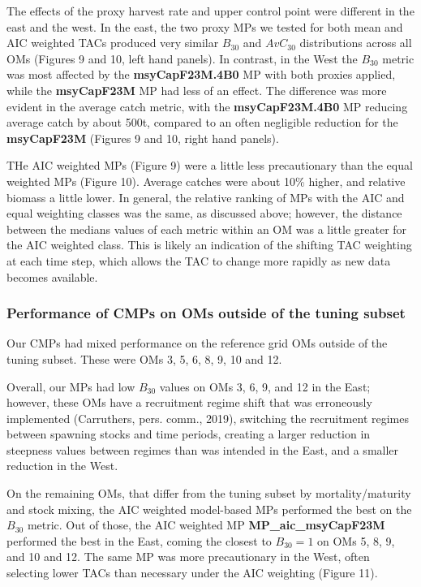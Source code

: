 \documentclass[]{article}
\begin{document}
The effects of the proxy harvest rate and upper control point
were different in the east and the west. In the east, the two
proxy MPs we tested for both mean and AIC weighted TACs produced
very similar \(B_{30}\) and \(AvC_{30}\) distributions across all
OMs (Figures 9 and 10, left hand panels). In contrast, in the
West the \(B_{30}\) metric was most affected by the \textbf{msyCapF23M.4B0}
MP with both proxies applied, while the \textbf{msyCapF23M} MP had
less of an effect. The difference was more evident in the average
catch metric, with the \textbf{msyCapF23M.4B0} MP reducing average
catch by about 500t, compared to an often negligible reduction for the
\textbf{msyCapF23M} (Figures 9 and 10, right hand panels).

THe AIC weighted MPs (Figure 9) were a little less precautionary
than the equal weighted MPs (Figure 10). Average catches
were about 10\% higher, and relative biomass a little lower.
In general, the relative ranking of MPs with the AIC and
equal weighting classes was the same, as discussed above;
however, the distance between the medians values of each
metric within an OM was a little greater for the AIC
weighted class. This is likely an indication of the
shifting TAC weighting at each time step, which allows
the TAC to change more rapidly as new data becomes available.

\hypertarget{performance-of-cmps-on-oms-outside-of-the-tuning-subset}{%
\subsubsection{Performance of CMPs on OMs outside of the tuning subset}\label{performance-of-cmps-on-oms-outside-of-the-tuning-subset}}

Our CMPs had mixed performance on the reference grid OMs outside
of the tuning subset. These were OMs 3, 5, 6, 8, 9, 10 and 12.

Overall, our MPs had low \(B_{30}\) values on OMs 3, 6, 9, and 12
in the East; however, these OMs have a recruitment regime shift that was
erroneously implemented (Carruthers, pers. comm., 2019), switching
the recruitment regimes between spawning stocks and time periods,
creating a larger reduction in steepness values between regimes
than was intended in the East, and a smaller reduction in the West.

On the remaining OMs, that differ from the tuning subset
by mortality/maturity and stock mixing, the AIC weighted model-based
MPs performed the best on the \(B_{30}\) metric. Out of those, the AIC
weighted MP \textbf{MP\_aic\_msyCapF23M} performed the best in the East,
coming the closest to \(B_{30} = 1\) on OMs 5, 8, 9, and 10 and 12.
The same MP was more precautionary in the West, often selecting
lower TACs than necessary under the AIC weighting (Figure 11).
\end{document}
